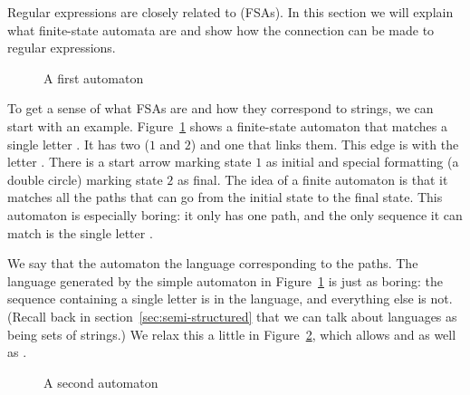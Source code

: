 \begin{underthehood}
\label{uth:fsas}
	

Regular expressions are closely related to  (FSAs). In this section we will explain what finite-state
automata are and show how the connection can be made to regular
expressions.

\begin{figure}
    \caption{A first automaton}
    \label{finite:state:first}
\end{figure}

To get a sense of what FSAs are and how they correspond to strings, we
can start with an example.  Figure~\ref{finite:state:first} shows a
finite-state automaton that matches a single letter . It has
two  ($1$ and $2$) and one 
that links them. This edge is  with the
letter . There is a start arrow marking state $1$ as initial
and special formatting (a double circle) marking state $2$ as
final. The idea of a finite automaton is that it matches all the paths
that can go from the initial state to the final state. This automaton
is especially boring: it only has one path, and the only sequence it
can match is the single letter .

We say that the automaton  the language
corresponding to the paths. The language generated by the simple
automaton in Figure~\ref{finite:state:first} is just as boring: the
sequence containing a single letter  is in the language, and
everything else is not.  (Recall back in
section~\ref{sec:semi-structured} that we can talk about languages as
being sets of strings.)  We relax this a little in
Figure~\ref{finite:state:second}, which allows  and  as well
as .

\begin{figure}
    \caption{A second automaton}
    \label{finite:state:second}
\end{figure}


\end{underthehood}
